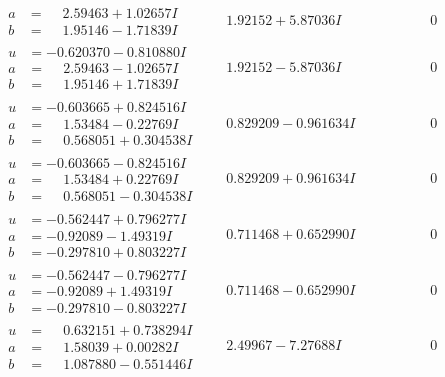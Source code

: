 \documentclass[1p]{elsarticle_modified}
\theoremstyle{definition}
\begin{document}
$$\begin{array}{c|c|c}
\begin{aligned}
a &= \phantom{-}2.59463 + 1.02657 I \\
b &= \phantom{-}1.95146 - 1.71839 I\end{aligned}
 & \phantom{-}1.92152 + 5.87036 I & \phantom{-0.000000 } 0 \\ \hline\begin{aligned}
u &= -0.620370 - 0.810880 I \\
a &= \phantom{-}2.59463 - 1.02657 I \\
b &= \phantom{-}1.95146 + 1.71839 I\end{aligned}
 & \phantom{-}1.92152 - 5.87036 I & \phantom{-0.000000 } 0 \\ \hline\begin{aligned}
u &= -0.603665 + 0.824516 I \\
a &= \phantom{-}1.53484 - 0.22769 I \\
b &= \phantom{-}0.568051 + 0.304538 I\end{aligned}
 & \phantom{-}0.829209 - 0.961634 I & \phantom{-0.000000 } 0 \\ \hline\begin{aligned}
u &= -0.603665 - 0.824516 I \\
a &= \phantom{-}1.53484 + 0.22769 I \\
b &= \phantom{-}0.568051 - 0.304538 I\end{aligned}
 & \phantom{-}0.829209 + 0.961634 I & \phantom{-0.000000 } 0 \\ \hline\begin{aligned}
u &= -0.562447 + 0.796277 I \\
a &= -0.92089 - 1.49319 I \\
b &= -0.297810 + 0.803227 I\end{aligned}
 & \phantom{-}0.711468 + 0.652990 I & \phantom{-0.000000 } 0 \\ \hline\begin{aligned}
u &= -0.562447 - 0.796277 I \\
a &= -0.92089 + 1.49319 I \\
b &= -0.297810 - 0.803227 I\end{aligned}
 & \phantom{-}0.711468 - 0.652990 I & \phantom{-0.000000 } 0 \\ \hline\begin{aligned}
u &= \phantom{-}0.632151 + 0.738294 I \\
a &= \phantom{-}1.58039 + 0.00282 I \\
b &= \phantom{-}1.087880 - 0.551446 I\end{aligned}
 & \phantom{-}2.49967 - 7.27688 I & \phantom{-0.000000 } 0 \\ \hline\begin{aligned}

\end{aligned}
\end{array}$$
\end{document}
